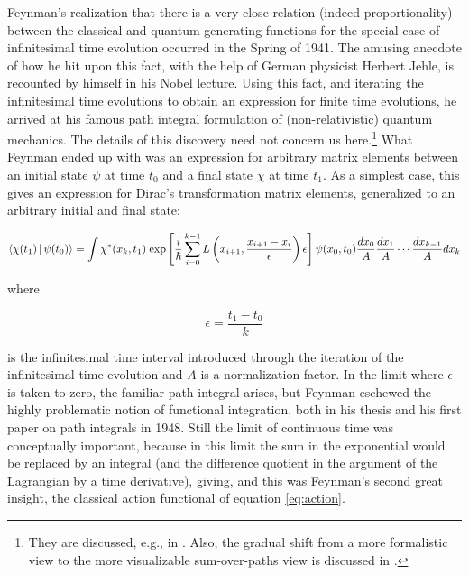 \documentclass[12pt,a4paper]{article}
\begin{document}
Feynman's realization that there is a very close relation (indeed proportionality) between the classical and quantum generating functions for the special case of infinitesimal time evolution occurred in the Spring of 1941. The amusing anecdote of how he hit upon this fact, with the help of German physicist Herbert Jehle, is recounted by himself in his Nobel lecture. Using this fact, and iterating the infinitesimal time evolutions to obtain an expression for finite time evolutions, he arrived at his famous path integral formulation of (non-relativistic) quantum mechanics. The details of this discovery need not concern us here.\footnote{They are discussed, e.g., in \citep{wuethrich_2010_the-genesis}. Also, the gradual shift from a more formalistic view to the more visualizable sum-over-paths view is discussed in \citep{schweber_1986_feynman}.} What Feynman ended up with was an expression for arbitrary matrix elements between an initial state $\psi$ at time $t_0$ and a final state $\chi$ at time $t_1$. As a simplest case, this gives an expression for Dirac's transformation matrix elements, generalized to an arbitrary initial and final state:

\begin{equation}
\label{eq:amplitude}
\Braket{\chi (t_1) | \psi (t_0)} =   \int  \chi^{\ast} (x_k, t_1) \; \mathrm{exp}\left[ \frac{i}{\hbar} \sum_{i=0}^{k-1} L \left( x_{i+1}, \frac{x_{i+1}-x_i}{\epsilon} \right) \epsilon \right] \psi (x_0, t_0) \frac{dx_0}{A} \frac{dx_1}{A} \cdots \frac{dx_{k-1}}{A} dx_k
\end{equation} 


where

\begin{equation}
\epsilon = \frac{t_1 - t_0}{k}
\end{equation}

is the infinitesimal time interval introduced through the iteration of the infinitesimal time evolution and $A$ is a normalization factor. In the limit where $\epsilon$ is taken to zero, the familiar path integral arises, but Feynman eschewed the highly problematic notion of functional integration, both in his thesis and his first paper on path integrals in 1948. Still the limit of continuous time was conceptually important, because in this limit the sum in the exponential would be replaced by an integral (and the difference quotient in the argument of the Lagrangian by a time derivative), giving, and this was Feynman's second great insight, the classical action functional of equation \ref{eq:action}.
\end{document}
